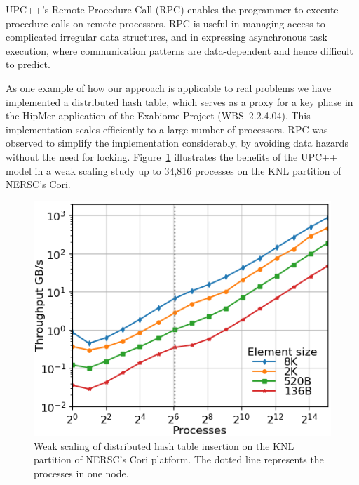 UPC++'s Remote Procedure Call (RPC)
enables the programmer
to execute procedure calls on remote processors.
RPC is useful in managing access to complicated irregular data structures,
and in expressing asynchronous task execution, where communication patterns
are data-dependent and hence difficult to predict.


As one example of how our approach is applicable to real problems
we have implemented a distributed hash table, which serves as a proxy
for a key phase in the HipMer application of the Exabiome Project (WBS~2.2.4.04).
This implementation scales efficiently
to a large number of processors. RPC was observed to simplify the implementation
considerably, by avoiding data hazards without the need for locking.
Figure~\ref{fig:dht} illustrates the benefits of the UPC++ model 
in a weak scaling study up to 34,816 processes on the KNL partition of NERSC's Cori.


\begin{figure}[htb]
\centering
      \includegraphics[scale=0.75]{projects/2.3.1-PMR/2.3.1.14-UPCxx-GASNet/all-cori-knl-out-inserts-wait.png}
  \caption{Weak scaling of distributed hash table insertion on the KNL partition of NERSC's Cori platform. The dotted line represents the processes in one node.}
  \label{fig:dht}
\end{figure}



